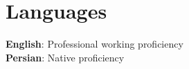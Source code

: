 \section{Languages}
\begin{itemize}[leftmargin=0.15in, label={}]
	\small{\item{
			 \textbf{English}{: Professional working proficiency} \\
			\textbf{Persian}{: Native proficiency} \\
	}}
\end{itemize}
